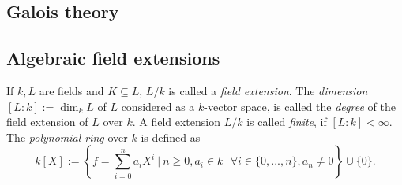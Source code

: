 \documentclass[11pt]{book}
\theoremstyle{nonumberbreak}
\newenvironment{nota}[1][]{\ifthenelse{\equal{#1}{}}{\notations}{\notations[#1]}\rm}{\endnotations}
\begin{document}
\begin{spacing}{1.3}
\thispagestyle{empty}




\newcommand{\homs}{\rm{Hom}\it}
\newcommand{\aut}{\rm{Aut}\it}
\newcommand{\gal}{\rm{Gal}\it}
\newcommand{\chara}{\rm{char}\it}


\chapter{Galois theory} %
\setlength\abovedisplayshortskip{0pt}
\setlength\belowdisplayshortskip{10pt}
\setlength\abovedisplayskip{10pt}
\setlength\belowdisplayskip{10pt}


\renewcommand*\thesection{§ \arabic{section}\quad}
\section{Algebraic field extensions} %
\renewcommand*\thesection{\arabic{section}}
\thispagestyle{empty}

\begin{nota} %
If $k,L$ are fields and $K\subseteq L$, $L/k$ is called a \textit{field extension}.
The \textit{dimension} $[L:k]:=\dim_{k}L$ of $L$ considered as a $k$-vector space, is called the \textit{degree} of the field extension of $L$ over $k$.
A field extension $L/k$ is called \textit{finite}, if $[L:k]<\infty$.
The \textit{polynomial ring} over $k$ is defined as
$$k[X]:=\left\{f=\sum_{i=0}^n a_i X^{i} \ \bigg \vert \ n \geqslant 0, a_i \in k \textit{ } \forall i \in \{0,...,n\}, a_n \neq 0 \right\} \cup \{0\}.$$
\end{nota}


\end{spacing}
\end{document}
